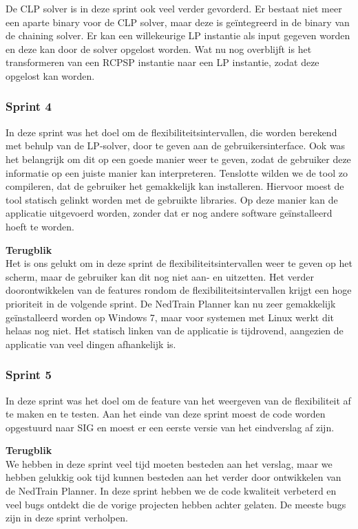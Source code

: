 De CLP solver is in deze sprint ook veel verder gevorderd. Er bestaat niet meer een aparte binary voor de CLP solver, maar deze is ge\"integreerd in de binary van de chaining solver. Er kan een willekeurige LP instantie als input gegeven worden en deze kan door de solver opgelost worden. Wat nu nog overblijft is het transformeren van een RCPSP instantie naar een LP instantie, zodat deze opgelost kan worden.

\subsubsection{Sprint 4}
In deze sprint was het doel om de flexibiliteitsintervallen, die worden berekend met behulp van de LP-solver, door te geven aan de gebruikersinterface. Ook was het belangrijk om dit op een goede manier weer te geven, zodat de gebruiker deze informatie op een juiste manier kan interpreteren. Tenslotte wilden we de tool zo compileren, dat de gebruiker het gemakkelijk kan installeren. Hiervoor moest de tool statisch gelinkt worden met de gebruikte libraries. Op deze manier kan de applicatie uitgevoerd worden, zonder dat er nog andere software ge\"installeerd hoeft te worden.

\textbf{Terugblik} \\
Het is ons gelukt om in deze sprint de flexibiliteitsintervallen weer te geven op het scherm, maar de gebruiker kan dit nog niet aan- en uitzetten. Het verder doorontwikkelen van de features rondom de flexibiliteitsintervallen krijgt een hoge prioriteit in de volgende sprint. De NedTrain Planner kan nu zeer gemakkelijk ge\"installeerd worden op Windows 7, maar voor systemen met Linux werkt dit helaas nog niet. Het statisch linken van de applicatie is tijdrovend, aangezien de applicatie van veel dingen afhankelijk is. 

\subsubsection{Sprint 5}
In deze sprint was het doel om de feature van het weergeven van de flexibiliteit af te maken en te testen. Aan het einde van deze sprint moest de code worden opgestuurd naar SIG en moest er een eerste versie van het eindverslag af zijn. 

\textbf{Terugblik} \\
We hebben in deze sprint veel tijd moeten besteden aan het verslag, maar we hebben gelukkig ook tijd kunnen besteden aan het verder door ontwikkelen van de NedTrain Planner. In deze sprint hebben we de code kwaliteit verbeterd en veel bugs ontdekt die de vorige projecten hebben achter gelaten. De meeste bugs zijn in deze sprint verholpen.

